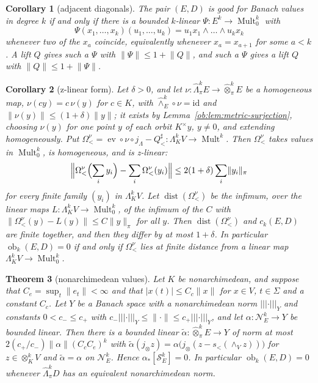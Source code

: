 \documentclass[11pt]{amsart}
\newtheorem{theorem}{Theorem}[section]
\newtheorem{corollary}[theorem]{Corollary}
\theoremstyle{definition}
\theoremstyle{remark}
\numberwithin{equation}{section}
\newcommand{\Mult}{\operatorname{Mult}}
\newcommand{\id}{\mathrm{id}}
\newcommand{\abs}[1]{\lvert #1\rvert}
\newcommand{\norm}[1]{\lVert #1\rVert}
\theoremstyle{plain}
\theoremstyle{definition}
\theoremstyle{plain}
\newcommand{\ev}{\operatorname{ev}}
\newcommand{\ob}{\operatorname{ob}}
\newcommand{\hLambda}{\widehat\Lambda}
\newcommand{\cN}{\mathcal N}
\newcommand{\cS}{\mathcal S}
\begin{document}
\begin{corollary}[adjacent diagonals]\label{ob:cor:adjacent}
The pair $(E,D)$ is good for Banach values in degree $k$ if and only if there is a bounded $k$-linear
$\Psi\colon E^k\to\Mult^k_0$ with
\[
 \Psi(x_1,\dots,x_k)(u_1,\dots,u_k)=u_1x_1\wedge\dots\wedge u_kx_k
\]
whenever two of the $x_a$ coincide, equivalently whenever $x_a=x_{a+1}$ for some $a<k$. A lift $Q$ gives such a $\Psi$ with
$\norm\Psi\le1+\norm Q$, and such a $\Psi$ gives a lift $Q$ with $\norm Q\le1+\norm\Psi$.
\end{corollary}

\begin{corollary}[z-linear form]\label{ob:cor:z-linear}
Let $\delta>0$, and let $\nu\colon\hLambda^k_\pi E\to\widehat\otimes^k_\pi E$ be a homogeneous map, $\nu(cy)=c\,\nu(y)$ for $c\in K$,
with $\widehat\wedge^k_E\circ\nu=\id$ and $\norm{\nu(y)}\le(1+\delta)\norm y$; it exists by Lemma~\ref{ob:lem:metric-surjection},
choosing $\nu(y)$ for one point $y$ of each orbit $K^\times y$, $y\ne0$, and extending homogeneously. Put
$\Omega^\nu_<=\ev\circ\nu\circ j_\Lambda-Q^\sharp_<\colon\Lambda^k_KV\to\Mult^k$. Then $\Omega^\nu_<$ takes values in $\Mult^k_0$, is
homogeneous, and is \emph{z-linear}:
\[
 \Bigl\lVert\Omega^\nu_<\Bigl(\sum_iy_i\Bigr)-\sum_i\Omega^\nu_<(y_i)\Bigr\rVert\le2(1+\delta)\sum_i\norm{y_i}_\pi
\]
for every finite family $(y_i)$ in $\Lambda^k_KV$. Let $\operatorname{dist}(\Omega^\nu_<)$ be the infimum, over the linear maps
$L\colon\Lambda^k_KV\to\Mult^k_0$, of the infimum of the $C$ with $\norm{\Omega^\nu_<(y)-L(y)}\le C\norm y_\pi$ for all $y$. Then
$\operatorname{dist}(\Omega^\nu_<)$ and $c_k(E,D)$ are finite together, and then they differ by at most $1+\delta$. In
particular $\ob_k(E,D)=0$ if and only if $\Omega^\nu_<$ lies at finite distance from a linear map $\Lambda^k_KV\to\Mult^k_0$.
\end{corollary}

\begin{theorem}[nonarchimedean values]\label{ob:thm:ultrametric}
Let $K$ be nonarchimedean, and suppose that $C_e=\sup_t\norm{e_t}<\infty$ and that $\abs{x(t)}\le C_c\norm x$ for $x\in V$,
$t\in\Sigma$ and a constant $C_c$. Let $Y$ be a Banach space with a nonarchimedean norm $\lvert\!\lvert\!\lvert\cdot\rvert\!\rvert\!\rvert_Y$ and constants $0<c_-\le c_+$
with $c_-\lvert\!\lvert\!\lvert\cdot\rvert\!\rvert\!\rvert_Y\le\norm\cdot\le c_+\lvert\!\lvert\!\lvert\cdot\rvert\!\rvert\!\rvert_Y$, and let $\alpha\colon\cN^k_E\to Y$ be bounded linear. Then there is a bounded linear
$\tilde\alpha\colon\widehat\otimes^k_\pi E\to Y$ of norm at most $2(c_+/c_-)\norm\alpha(C_cC_e)^k$ with
$\tilde\alpha(j_\otimes z)=\alpha\bigl(j_\otimes(z-s_<(\wedge_Vz))\bigr)$ for $z\in\otimes^k_KV$ and $\tilde\alpha=\alpha$ on $\cN^k_E$. Hence
$\alpha_*[\cS^k_E]=0$. In particular $\ob_k(E,D)=0$ whenever $\hLambda^k_\pi D$ has an equivalent nonarchimedean norm.
\end{theorem}
\end{document}
